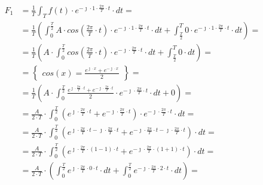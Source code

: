 \begin{task}


\begin{align*}
F_1&=\frac{1}{T}\int_{T}f(t) \cdot e^{-\jmath \cdot 1 \cdot \frac{2\pi}{T} \cdot t} \cdot dt=\\
&=\frac{1}{T}\left( \int_{0}^{\frac{T}{2}}A \cdot cos\left( \frac{2\pi}{T} \cdot t\right) \cdot e^{ - \jmath \cdot 1 \cdot \frac{2\pi}{T} \cdot t} \cdot dt + \int_{\frac{T}{2}}^{T} 0 \cdot e^{ - \jmath \cdot 1 \cdot \frac{2\pi}{T} \cdot t} \cdot dt\right)=\\
&=\frac{1}{T}\left( A \cdot  \int_{0}^{\frac{T}{2}}cos\left( \frac{2\pi}{T} \cdot t\right) \cdot e^{ -\jmath \cdot \frac{2\pi}{T} \cdot t} \cdot dt + \int_{\frac{T}{2}}^{T} 0 \cdot dt\right)=\\
&=\begin{Bmatrix}
cos\left(x\right) = \frac{e^{\jmath \cdot x}+e^{-\jmath \cdot x}}{2}
\end{Bmatrix}=\\
&=\frac{1}{T}\left( A \cdot  \int_{0}^{\frac{T}{2}} \frac{e^{\jmath \cdot \frac{2\pi}{T} \cdot t}+e^{-\jmath \cdot \frac{2\pi}{T} \cdot t}}{2} \cdot e^{ - \jmath \cdot \frac{2\pi}{T} \cdot t} \cdot dt + 0\right)=\\
&=\frac{A}{2\cdot T}\cdot  \int_{0}^{\frac{T}{2}} \left(e^{\jmath \cdot \frac{2\pi}{T} \cdot t}+e^{-\jmath \cdot \frac{2\pi}{T} \cdot t}\right) \cdot e^{- \jmath \cdot \frac{2\pi}{T} \cdot t} \cdot dt =\\
&=\frac{A}{2\cdot T}\cdot  \int_{0}^{\frac{T}{2}} \left(e^{\jmath \cdot \frac{2\pi}{T} \cdot t - \jmath \cdot \frac{2\pi}{T} \cdot t}+e^{-\jmath \cdot \frac{2\pi}{T} \cdot t - \jmath \cdot \frac{2\pi}{T} \cdot t}\right) \cdot dt =\\
&=\frac{A}{2\cdot T}\cdot  \int_{0}^{\frac{T}{2}} \left(e^{\jmath \cdot \frac{2\pi}{T} \cdot \left(1 -1\right) \cdot t}+e^{-\jmath \cdot \frac{2\pi}{T} \cdot \left(1+1\right)\cdot t }\right) \cdot dt =\\
&=\frac{A}{2\cdot T}\cdot \left( \int_{0}^{\frac{T}{2}} e^{\jmath \cdot \frac{2\pi}{T} \cdot 0 \cdot t} \cdot dt + \int_{0}^{\frac{T}{2}} e^{-\jmath \cdot \frac{2\pi}{T} \cdot 2 \cdot t } \cdot dt \right)=\\

\end{align*}
\end{task}
